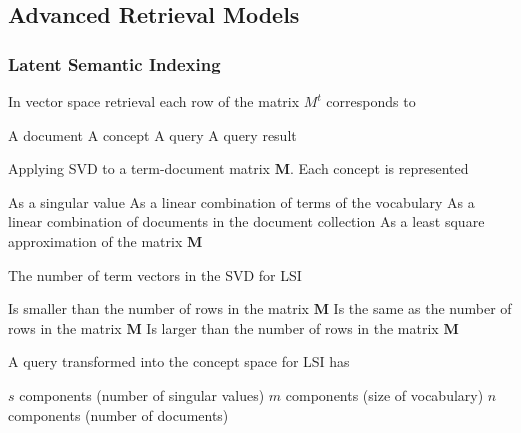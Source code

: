 \documentclass[12pt,a4paper]{exam} %
\newcommand{\mat}[1]{\ensuremath{\textbf{#1}}}
\begin{document}
\subsection{Advanced Retrieval Models} %

\subsubsection{Latent Semantic Indexing}

\begin{questions}

\question In vector space retrieval each row of the matrix $M^t$ corresponds to
\begin{checkboxes}
\CorrectChoice A document
\choice A concept
\choice A query
\choice A query result
\end{checkboxes}

\question Applying SVD to a term-document matrix \mat{M}. Each concept is represented
\begin{checkboxes}
\choice As a singular value
\CorrectChoice As a linear combination of terms of the vocabulary
\choice As a linear combination of documents in the document collection
\choice As a least square approximation of the matrix \mat{M}
\end{checkboxes}

\question The number of term vectors in the SVD for LSI
\begin{checkboxes}
\choice Is smaller than the number of rows in the matrix \mat{M}
\CorrectChoice Is the same as the number of rows in the matrix \mat{M}
\choice Is larger than the number of rows in the matrix \mat{M}
\end{checkboxes}

\question A query transformed into the concept space for LSI has
\begin{checkboxes}
\CorrectChoice $s$ components (number of singular values)
\choice $m$ components (size of vocabulary)
\choice $n$ components (number of documents)
\end{checkboxes}
\end{questions}
\end{document}
